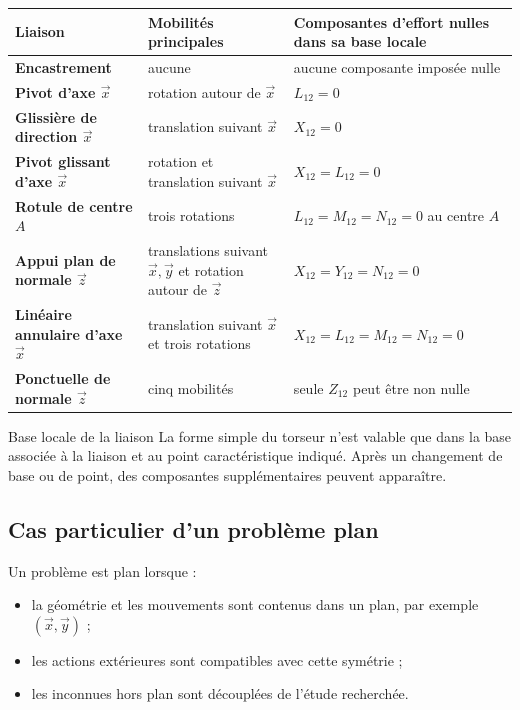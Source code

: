 \begin{center}
\small
\begin{tabularx}{\linewidth}{>{\bfseries}l X X}
\toprule
Liaison & Mobilités principales & Composantes d'effort nulles dans sa base locale \\
\midrule
Encastrement & aucune & aucune composante imposée nulle \\
Pivot d'axe $\vec x$ & rotation autour de $\vec x$ & $L_{12}=0$ \\
Glissière de direction $\vec x$ & translation suivant $\vec x$ & $X_{12}=0$ \\
Pivot glissant d'axe $\vec x$ & rotation et translation suivant $\vec x$ & $X_{12}=L_{12}=0$ \\
Rotule de centre $A$ & trois rotations & $L_{12}=M_{12}=N_{12}=0$ au centre $A$ \\
Appui plan de normale $\vec z$ & translations suivant $\vec x,\vec y$ et rotation autour de $\vec z$ & $X_{12}=Y_{12}=N_{12}=0$ \\
Linéaire annulaire d'axe $\vec x$ & translation suivant $\vec x$ et trois rotations & $X_{12}=L_{12}=M_{12}=N_{12}=0$ \\
Ponctuelle de normale $\vec z$ & cinq mobilités & seule $Z_{12}$ peut être non nulle \\
\bottomrule
\end{tabularx}
\end{center}

\begin{TLWarning}{Base locale de la liaison}
La forme simple du torseur n'est valable que dans la base associée à la liaison et au point caractéristique indiqué. Après un changement de base ou de point, des composantes supplémentaires peuvent apparaître.
\end{TLWarning}

\subsection{Cas particulier d'un problème plan}

Un problème est plan lorsque :
\begin{itemize}
  \item la géométrie et les mouvements sont contenus dans un plan, par exemple $(\vec x,\vec y)$ ;
  \item les actions extérieures sont compatibles avec cette symétrie ;
  \item les inconnues hors plan sont découplées de l'étude recherchée.
\end{itemize}


